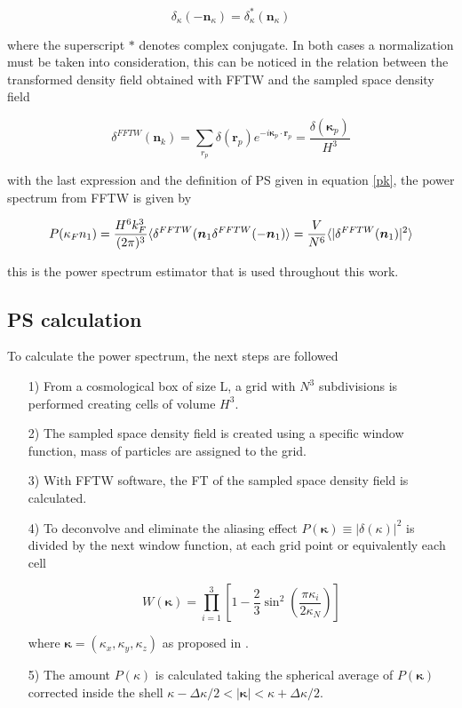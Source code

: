 \[\delta_\kappa(-\textbf{n}_\kappa) = \delta_\kappa^*(\textbf{n}_\kappa)\]

where the superscript $*$ denotes complex conjugate. In both cases a normalization 
must be taken into consideration, this can be noticed in the relation between the transformed 
density field obtained with FFTW and the sampled space density field 

\[\delta^{FFTW}(\textbf{n}_k) = \sum_{r_p} \delta(\textbf{r}_p)e^{-i\boldsymbol{\kappa}_p\cdot \boldsymbol{r}_p} = \frac{\delta(\boldsymbol{\kappa}_p)}{H^3}\]

with the last expression and the definition of PS given in equation \ref{pk}, the power
spectrum from FFTW is given by \cite{Djeong}

\begin{equation}
P(\kappa_F n_1) = \frac{H^6 k^3_F}{(2\pi)^3}\langle\delta^{FFTW}(\mbox{\boldmath$n$}_1\delta^{FFTW}(-\mbox{\boldmath$n$}_1)\rangle = \frac{V}{N^6}\langle|\delta^{FFTW}(\mbox{\boldmath$n$}_1)|^2\rangle
\end{equation} 

this is the power spectrum estimator that is used throughout this work. 

\subsection{PS calculation}

To calculate the power spectrum, the next steps are followed

\begin{enumerate}

\item[1)] From a cosmological box of size L, a grid with $N^3$ subdivisions is performed
creating cells of volume $H^3$. 

\item[2)] The sampled space density field is created using a specific window function,
mass of particles are assigned to the grid. 

\item[3)] With FFTW software, the FT of the sampled space density field is calculated.

\item[4)] To deconvolve and eliminate the aliasing effect $P(\boldsymbol{\kappa})\equiv |\delta(\kappa)|^2$ is divided by the next window function, at each grid point or equivalently each cell

\[ W(\boldsymbol{\kappa}) = \prod^{3}_{i=1}\left[ 1 - \frac{2}{3}\sin^2\left(\frac{\pi\kappa_i}{2\kappa_N}\right) \right] \]

where $\boldsymbol{\kappa} = (\kappa_x,\kappa_y,\kappa_z)$ as proposed in \cite{Jeong}.  

\item[5)] The amount $P(\kappa)$ is calculated taking the spherical average of 
$P(\boldsymbol{\kappa})$ corrected inside the shell 
$\kappa -\Delta\kappa/2	< |\boldsymbol{\kappa}|<\kappa +\Delta\kappa/2$.

\end{enumerate}


